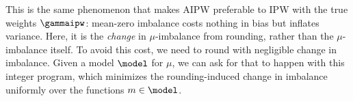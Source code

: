 This is the same phenomenon that makes AIPW preferable to IPW with the true weights $\gammaipw$: mean-zero imbalance costs nothing in bias but inflates variance. Here, it is the \emph{change} in $\mu$-imbalance from rounding, rather than the $\mu$-imbalance itself. To avoid this cost, we need to round with negligible change in imbalance. Given a model $\model$ for $\mu$, we can ask for that to happen with
this integer program, which minimizes the rounding-induced change in imbalance uniformly over the functions $m\in\model$.
